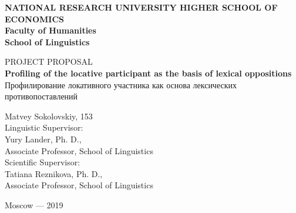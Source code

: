 \thispagestyle{empty}
\begin{center}
\noindent 

\textbf{NATIONAL RESEARCH UNIVERSITY HIGHER SCHOOL OF ECONOMICS}\\
\textbf{Faculty of Humanities}\\
\textbf{School of Linguistics}\\
\vfill

\huge{PROJECT PROPOSAL}\\
\large
\LARGE
\textbf{Profiling of the locative participant as the basis of lexical oppositions}\\
\Large
Профилирование локативного участника как основа лексических противопоставлений\\
\vfill
\vfill
\normalsize
\begin{flushright}
Matvey Sokolovskiy, 153\bigskip\\
Linguistic Supervisor:\\
Yury Lander, Ph. D., \\
Associate Professor, School of Linguistics\\
                       
Scientific Supervisor:\\
Tatiana Reznikova, Ph. D., \\
Associate Professor, School of Linguistics\\

\end{flushright}
\vfill
\begin{center}
Moscow --- 2019
\end{center}

\end{center}
\pagebreak